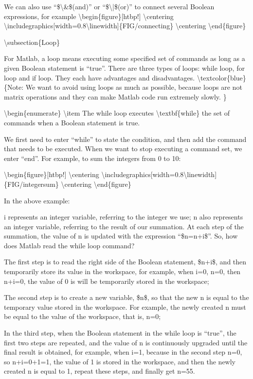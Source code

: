 \documentclass[10pt,math=newtx,citestyle=gb7714-2015,bibstyle=gb7714-2015]{elegantbook}
\begin{document}
	We can also use ``\$\textbackslash{}\&\$(and)'' or ``\$\textbackslash{}|\$(or)'' to connect several Boolean expressions, for example
	\textbackslash{}begin\{figure\}[htbp!]
	\textbackslash{}centering
	\textbackslash{}includegraphics[width=0.8\textbackslash{}linewidth]\{FIG/connecting\}
	\textbackslash{}centering
	\textbackslash{}end\{figure\}
	
	\textbackslash{}subsection\{Loop\}
	
	For Matlab, a loop means executing some specified set of commands as long as a given Boolean statement is ``true''. There are three types of loops: while loop, for loop and if loop. They each have advantages and disadvantages. \textbackslash{}textcolor\{blue\}\{Note: We want to avoid using loops as much as possible, because loops are not matrix operations and they can make Matlab code run extremely slowly. \}
	
	\textbackslash{}begin\{enumerate\}
	\textbackslash{}item The while loop executes \textbackslash{}textbf\{while\} the set of commands when a Boolean statement is true.
	
	We first need to enter ``while'' to state the condition, and then add the command that needs to be executed. When we want to stop executing a command set, we enter ``end''. For example, to sum the integers from 0 to 10:
	
	\textbackslash{}begin\{figure\}[htbp!]
	\textbackslash{}centering
	\textbackslash{}includegraphics[width=0.8\textbackslash{}linewidth]\{FIG/integersum\}
	\textbackslash{}centering
	\textbackslash{}end\{figure\}
	
	In the above example:
	
	i represents an integer variable, referring to the integer we use; n also represents an integer variable, referring to the result of our summation. At each step of the summation, the value of n is updated with the expression ``\$n=n+i\$''. So, how does Matlab read the while loop command?
	
	The first step is to read the right side of the Boolean statement, \$n+i\$, and then temporarily store its value in the workspace, for example, when i=0, n=0, then n+i=0, the value of 0 is will be temporarily stored in the workspace;
	
	The second step is to create a new variable, \$n\$, so that the new n is equal to the temporary value stored in the workspace. For example, the newly created n must be equal to the value of the workspace, that is, n=0;
	
	In the third step, when the Boolean statement in the while loop is ``true'', the first two steps are repeated, and the value of n is continuously upgraded until the final result is obtained, for example, when i=1, because in the second step n=0, so n+i=0+1=1, the value of 1 is stored in the workspace, and then the newly created n is equal to 1, repeat these steps, and finally get n=55.
	
\end{document}
